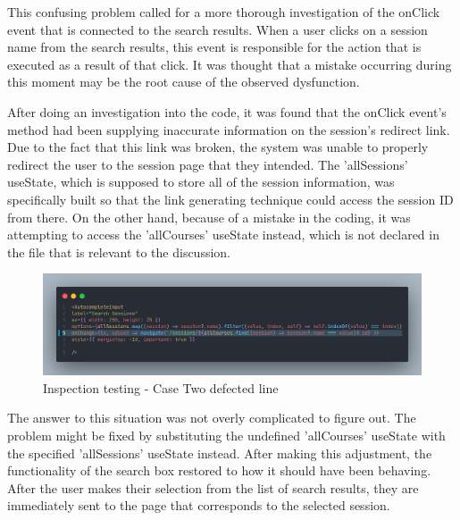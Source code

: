 \begin{justify}
    \vspace{0.25cm}
    \newendline This confusing problem called for a more thorough investigation of the onClick event that is connected to the search results. When a user clicks on a session name from the search results, this event is responsible for the action that is executed as a result of that click. It was thought that a mistake occurring during this moment may be the root cause of the observed dysfunction.

    \vspace{0.25cm}
    \newendline After doing an investigation into the code, it was found that the onClick event's method had been supplying inaccurate information on the session's redirect link. Due to the fact that this link was broken, the system was unable to properly redirect the user to the session page that they intended. The 'allSessions' useState, which is supposed to store all of the session information, was specifically built so that the link generating technique could access the session ID from there. On the other hand, because of a mistake in the coding, it was attempting to access the 'allCourses' useState instead, which is not declared in the file that is relevant to the discussion.

    \begin{figure}[H]
        \centerline{\includegraphics[width=150mm,scale=1]{figures/implementation_and_testing/testing/MIS/allcourses error.png}}
        \caption{Inspection testing - Case Two defected line}
        \label{Inspection_search_defect}
    \end{figure}

    \vspace{0.25cm}
    \newendline The answer to this situation was not overly complicated to figure out. The problem might be fixed by substituting the undefined 'allCourses' useState with the specified 'allSessions' useState instead. After making this adjustment, the functionality of the search box restored to how it should have been behaving. After the user makes their selection from the list of search results, they are immediately sent to the page that corresponds to the selected session.


\end{justify}
